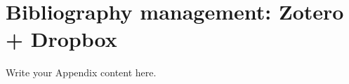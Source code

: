 
\chapter{Bibliography management: Zotero + Dropbox} %

\label{AppendixA} %


Write your Appendix content here.